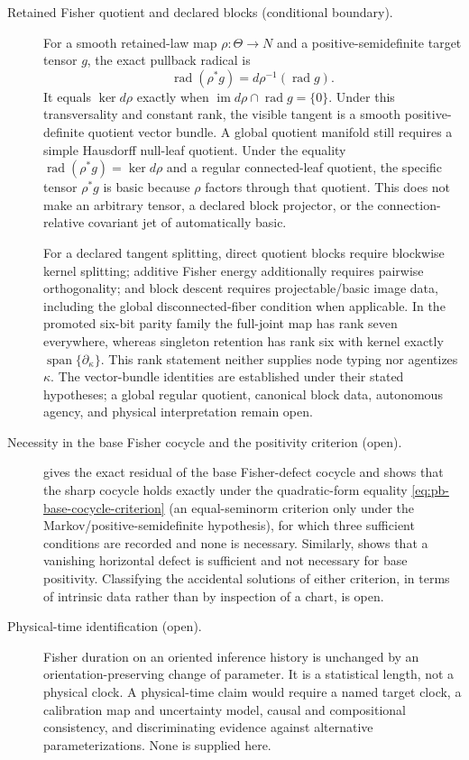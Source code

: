 \begin{description}
\item[Retained Fisher quotient and declared blocks (conditional boundary).]
For a smooth retained-law map \(\rho:\Theta\to N\) and a positive-semidefinite
target tensor \(g\), the exact pullback radical is
\[
\operatorname{rad}(\rho^*g)
 =d\rho^{-1}(\operatorname{rad}g).
\]
It equals \(\ker d\rho\) exactly when
\(\operatorname{im}d\rho\cap\operatorname{rad}g=\{0\}\).  Under this
transversality and constant rank, the visible tangent is a smooth
positive-definite quotient vector bundle.  A global quotient manifold still
requires a simple Hausdorff null-leaf quotient.  Under the equality
\(\operatorname{rad}(\rho^*g)=\ker d\rho\) and a regular connected-leaf
quotient, the specific tensor \(\rho^*g\) is basic because \(\rho\) factors
through that quotient.  This does not make an arbitrary tensor, a
declared block projector, or the connection-relative covariant jet of
 automatically basic.

For a declared tangent splitting, direct quotient blocks require blockwise
kernel splitting; additive Fisher energy additionally requires pairwise
orthogonality; and block descent requires projectable/basic image data,
including the global disconnected-fiber condition when applicable.  In the
promoted six-bit parity family the full-joint map has rank seven everywhere,
whereas singleton retention has rank six with kernel exactly
\(\operatorname{span}\{\partial_\kappa\}\).  This rank statement neither
supplies node typing nor agentizes \(\kappa\).  The vector-bundle identities
are established under their stated hypotheses; a global regular quotient,
canonical block data, autonomous agency, and physical interpretation remain
open. 

\item[Necessity in the base Fisher cocycle and the positivity criterion (open).]
 gives the exact residual of the base
Fisher-defect cocycle and shows that the sharp cocycle holds exactly under the
quadratic-form equality \eqref{eq:pb-base-cocycle-criterion} (an equal-seminorm
criterion only under the Markov/positive-semidefinite hypothesis), for which
three sufficient conditions are recorded and none is necessary.  Similarly,
 shows that a vanishing horizontal
defect is sufficient and not necessary for base positivity.  Classifying the
accidental solutions of either criterion, in terms of intrinsic data rather
than by inspection of a chart, is open. 

\item[Physical-time identification (open).]
Fisher duration on an oriented inference history is unchanged by an
orientation-preserving change of parameter.  It is a statistical length, not
a physical clock.  A physical-time claim would require a named target clock,
a calibration map and uncertainty model, causal and compositional consistency,
and discriminating evidence against alternative parameterizations.  None is
supplied here. 
\end{description}

